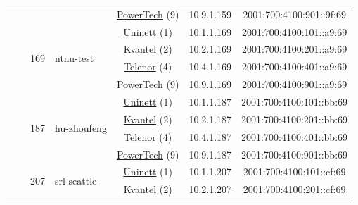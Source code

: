 \begin{small}
\begin{center}
\begin{longtable}{|c|c|c|c|c|c|c|c|}
  &  &  &  & \multicolumn{2}{|c|}{\tiny{\href{http://www.powertech.no}{PowerTech} (9)}} & \tiny{10.9.1.159} & \tiny{2001:700:4100:901::9f:69} \\* \cline{3-3}\cline{4-4}\cline{5-5}\cline{6-6}\cline{7-7}\cline{8-8}
  &  & \multirow{4}{*}{\tiny{169}} & \multicolumn{1}{|l|}{\multirow{4}{*}{\tiny{ntnu-test}}} & \multicolumn{2}{|c|}{\tiny{\href{https://www.uninett.no}{Uninett} (1)}} & \tiny{10.1.1.169} & \tiny{2001:700:4100:101::a9:69} \\* \cline{5-5}\cline{6-6}\cline{7-7}\cline{8-8}
  &  &  &  & \multicolumn{2}{|c|}{\tiny{\href{http://kvantel.no}{Kvantel} (2)}} & \tiny{10.2.1.169} & \tiny{2001:700:4100:201::a9:69} \\* \cline{5-5}\cline{6-6}\cline{7-7}\cline{8-8}
  &  &  &  & \multicolumn{2}{|c|}{\tiny{\href{https://www.telenor.no}{Telenor} (4)}} & \tiny{10.4.1.169} & \tiny{2001:700:4100:401::a9:69} \\* \cline{5-5}\cline{6-6}\cline{7-7}\cline{8-8}
  &  &  &  & \multicolumn{2}{|c|}{\tiny{\href{http://www.powertech.no}{PowerTech} (9)}} & \tiny{10.9.1.169} & \tiny{2001:700:4100:901::a9:69} \\* \cline{3-3}\cline{4-4}\cline{5-5}\cline{6-6}\cline{7-7}\cline{8-8}
  &  & \multirow{4}{*}{\tiny{187}} & \multicolumn{1}{|l|}{\multirow{4}{*}{\tiny{hu-zhoufeng}}} & \multicolumn{2}{|c|}{\tiny{\href{https://www.uninett.no}{Uninett} (1)}} & \tiny{10.1.1.187} & \tiny{2001:700:4100:101::bb:69} \\* \cline{5-5}\cline{6-6}\cline{7-7}\cline{8-8}
  &  &  &  & \multicolumn{2}{|c|}{\tiny{\href{http://kvantel.no}{Kvantel} (2)}} & \tiny{10.2.1.187} & \tiny{2001:700:4100:201::bb:69} \\* \cline{5-5}\cline{6-6}\cline{7-7}\cline{8-8}
  &  &  &  & \multicolumn{2}{|c|}{\tiny{\href{https://www.telenor.no}{Telenor} (4)}} & \tiny{10.4.1.187} & \tiny{2001:700:4100:401::bb:69} \\* \cline{5-5}\cline{6-6}\cline{7-7}\cline{8-8}
  &  &  &  & \multicolumn{2}{|c|}{\tiny{\href{http://www.powertech.no}{PowerTech} (9)}} & \tiny{10.9.1.187} & \tiny{2001:700:4100:901::bb:69} \\* \cline{3-3}\cline{4-4}\cline{5-5}\cline{6-6}\cline{7-7}\cline{8-8}
  &  & \multirow{4}{*}{\tiny{207}} & \multicolumn{1}{|l|}{\multirow{4}{*}{\tiny{srl-seattle}}} & \multicolumn{2}{|c|}{\tiny{\href{https://www.uninett.no}{Uninett} (1)}} & \tiny{10.1.1.207} & \tiny{2001:700:4100:101::cf:69} \\* \cline{5-5}\cline{6-6}\cline{7-7}\cline{8-8}
  &  &  &  & \multicolumn{2}{|c|}{\tiny{\href{http://kvantel.no}{Kvantel} (2)}} & \tiny{10.2.1.207} & \tiny{2001:700:4100:201::cf:69} \\* \cline{5-5}\cline{6-6}\cline{7-7}\cline{8-8}

\end{longtable}
\end{center}
\end{small}
